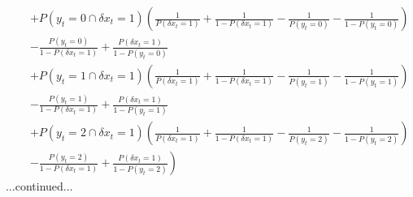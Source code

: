 \documentclass[a4paper,11pt]{article}
\begin{document}
\begin{eqnarray*}
& &+P(y_t=0\cap \delta x_t=1) \left( \frac{1}{P(\delta x_t=1)}+\frac{1}{1-P(\delta x_t=1)} - \frac{1}{P(y_t=0)}-\frac{1}{1-P(y_t=0)}\right)\\
& &-\frac{P(y_t=0)}{1-P(\delta x_t=1)}+\frac{P(\delta x_t=1)}{1-P(y_t=0)}\\
& &+ P(y_t=1\cap \delta x_t=1) \left( \frac{1}{P(\delta x_t=1)}+\frac{1}{1-P(\delta x_t=1)} - \frac{1}{P(y_t=1)}-\frac{1}{1-P(y_t=1)}\right)\\
& &-\frac{P(y_t=1)}{1-P(\delta x_t=1)}+\frac{P(\delta x_t=1)}{1-P(y_t=1)}\\
& &+ P(y_t=2\cap \delta x_t=1) \left( \frac{1}{P(\delta x_t=1)}+\frac{1}{1-P(\delta x_t=1)} - \frac{1}{P(y_t=2)}-\frac{1}{1-P(y_t=2)}\right)\\
& &\left.-\frac{P(y_t=2)}{1-P(\delta x_t=1)}+\frac{P(\delta x_t=1)}{1-P(y_t=2)}\right)
\end{eqnarray*}
$\ldots$continued$\ldots$
\end{document}
